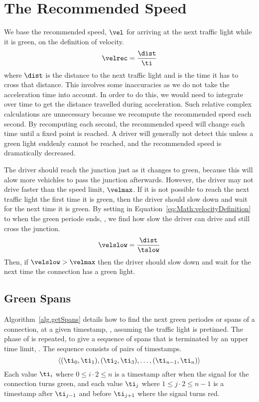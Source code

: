 \section{The Recommended Speed}\label{sec:Math}

We base the recommended speed, $\vel$ for arriving at the next traffic light while it is green, on the definition of velocity.
\begin{eqnarray}
\velrec = \frac{\dist}{\ti}\label{eq:Math:velocityDefinition}
\end{eqnarray}
where $\dist$ is the distance to the next traffic light and \ti is the time it has to cross that distance.
This involves some inaccuracies as we do not take the acceleration time into account. %
In order to do this, we would need to integrate over time to get the distance travelled during acceleration.
Such relative complex calculations are unnecessary because we recompute the recommended speed each second.
By recomputing each second, the recommended speed will change each time until a fixed point is reached. 
A driver will generally not detect this unless a green light suddenly cannot be reached, and the recommended speed is dramatically decreased. %

The driver should reach the junction just as it changes to green, because this will alow more vehichles to pass the junction afterwards.
However, the driver may not drive faster than the speed limit, $\velmax$.
If it is not possible to reach the next traffic light the first time it is green, then the driver should slow down and wait for the next time it is green.
By setting \ti in Equation~\ref{eq:Math:velocityDefinition} to when the green periode ends, \tslow, we find how slow the driver can drive and still cross the junction.
\begin{eqnarray}
\velslow = \frac{\dist}{\tslow}\label{eq:Math:velocitySlow}
\end{eqnarray}
Then, if $\velslow > \velmax$ then the driver should slow down and wait for the next time the connection has a green light.

\subsection{Green Spans}\label{sec:greenSpans}
Algorithm~\ref{alg.getSpans} details how to find the next green periodes or spans of a connection, \con at a given timestamp, \ti, assuming the traffic light is pretimed.
The phase of \con is repeated, to give a sequence of spans that is terminated by an upper time limit, \tmax.
The sequence consists of pairs of timestamps.
\[\langle(\ti_0, \ti_1), (\ti_2, \ti_3), \dots, (\ti_{n-1}, \ti_n)\rangle\]
Each value $\ti_i$ where $0\leq i\cdot 2\leq n$ is a timestamp after \ti when the signal for the connection turns green, and each value $\ti_j$ where $1\leq j\cdot 2\leq n-1$ is a timestamp after $\ti_{j-1}$ and before $\ti_{j+1}$ where the signal turns red.

